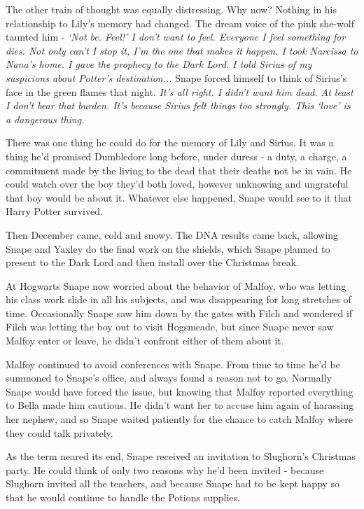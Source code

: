 \documentclass[a4paper,11pt]{article}
\begin{document}
The other train of thought was equally distressing. Why now? Nothing in his relationship to Lily's memory had changed. The dream voice of the pink she-wolf taunted him - \emph{`Not be. Feel!' I don't want to feel. Everyone I feel something for dies. Not only can't I stop it, I'm the one that makes it happen. I took Narcissa to Nana's home. I gave the prophecy to the Dark Lord. I told Sirius of my suspicions about Potter's destination...} Snape forced himself to think of Sirius's face in the green flames that night. \emph{It's all right. I didn't want him dead. At least I don't bear that burden. It's because Sirius felt things too strongly. This `love' is a dangerous thing.}

There was one thing he could do for the memory of Lily and Sirius. It was a thing he'd promised Dumbledore long before, under duress - a duty, a charge, a commitment made by the living to the dead that their deaths not be in vain. He could watch over the boy they'd both loved, however unknowing and ungrateful that boy would be about it. Whatever else happened, Snape would see to it that Harry Potter survived.

Then December came, cold and snowy. The DNA results came back, allowing Snape and Yaxley do the final work on the shields, which Snape planned to present to the Dark Lord and then install over the Christmas break.

At Hogwarts Snape now worried about the behavior of Malfoy, who was letting his class work slide in all his subjects, and was disappearing for long stretches of time. Occasionally Snape saw him down by the gates with Filch and wondered if Filch was letting the boy out to visit Hogsmeade, but since Snape never saw Malfoy enter or leave, he didn't confront either of them about it.

Malfoy continued to avoid conferences with Snape. From time to time he'd be summoned to Snape's office, and always found a reason not to go. Normally Snape would have forced the issue, but knowing that Malfoy reported everything to Bella made him cautious. He didn't want her to accuse him again of harassing her nephew, and so Snape waited patiently for the chance to catch Malfoy where they could talk privately.

As the term neared its end, Snape received an invitation to Slughorn's Christmas party. He could think of only two reasons why he'd been invited - because Slughorn invited all the teachers, and because Snape had to be kept happy so that he would continue to handle the Potions supplies.
\end{document}
